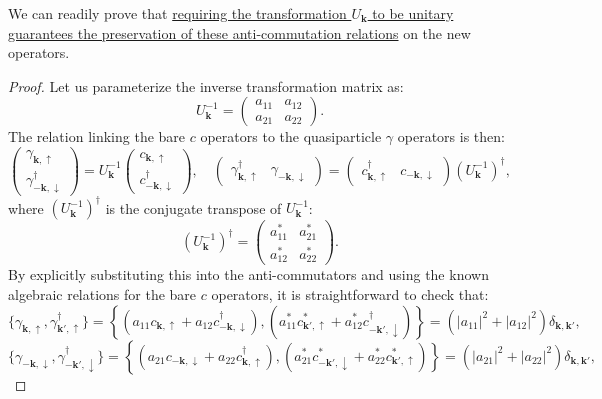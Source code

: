 We can readily prove that \uline{requiring the transformation \( U_{\mathbf{k}} \) to be unitary guarantees the preservation of these anti-commutation relations} on the new operators.
\begin{proof}
    Let us parameterize the inverse transformation matrix as:
    \[
        U_{\mathbf{k}}^{-1} = \begin{pmatrix} a_{11} & a_{12} \\ a_{21} & a_{22} \end{pmatrix}.
    \]
    The relation linking the bare \( c \) operators to the quasiparticle \( \gamma \) operators is then:
    \[
        \begin{pmatrix} \gamma_{\mathbf{k},\uparrow} \\ \gamma_{-\mathbf{k},\downarrow}^\dagger \end{pmatrix} = U_{\mathbf{k}}^{-1} \begin{pmatrix} c_{\mathbf{k},\uparrow} \\ c_{-\mathbf{k},\downarrow}^\dagger \end{pmatrix}, \quad \begin{pmatrix} \gamma_{\mathbf{k},\uparrow}^\dagger & \gamma_{-\mathbf{k},\downarrow} \end{pmatrix} = \begin{pmatrix} c_{\mathbf{k},\uparrow}^\dagger & c_{-\mathbf{k},\downarrow} \end{pmatrix} (U_{\mathbf{k}}^{-1})^\dagger,
    \]
    where \((U_{\mathbf{k}}^{-1})^\dagger\) is the conjugate transpose of \(U_{\mathbf{k}}^{-1}\):
    \[
        (U_{\mathbf{k}}^{-1})^\dagger = \begin{pmatrix} a_{11}^* & a_{21}^* \\ a_{12}^* & a_{22}^* \end{pmatrix}.
    \]
    By explicitly substituting this into the anti-commutators and using the known algebraic relations for the bare \( c \) operators, it is straightforward to check that:
    \[
        \{ \gamma_{\mathbf{k},\uparrow}, \gamma_{\mathbf{k}',\uparrow}^\dagger \} = \left\{ \left(a_{11} c_{\mathbf{k},\uparrow} + a_{12} c_{-\mathbf{k},\downarrow}^\dagger\right), \left(a_{11}^* c_{\mathbf{k}',\uparrow}^* + a_{12}^* c_{-\mathbf{k}',\downarrow}^\dagger\right) \right\}= (|a_{11}|^2 + |a_{12}|^2) \delta_{\mathbf{k},\mathbf{k}'},
    \]
    \[
        \{ \gamma_{-\mathbf{k},\downarrow}, \gamma_{-\mathbf{k}',\downarrow}^\dagger \} = \left\{ \left(a_{21} c_{-\mathbf{k},\downarrow} + a_{22} c_{\mathbf{k},\uparrow}^\dagger\right), \left(a_{21}^* c_{-\mathbf{k}',\downarrow}^* + a_{22}^* c_{\mathbf{k}',\uparrow}^*\right) \right\} = (|a_{21}|^2 + |a_{22}|^2) \delta_{\mathbf{k},\mathbf{k}'},
\]
\end{proof}
